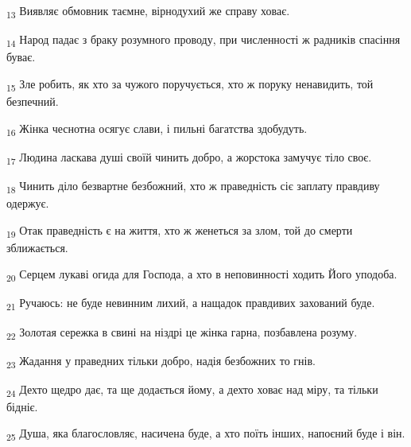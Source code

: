 \begin{tcolorbox}
\textsubscript{13} Виявляє обмовник таємне, вірнодухий же справу ховає.
\end{tcolorbox}
\begin{tcolorbox}
\textsubscript{14} Народ падає з браку розумного проводу, при численності ж радників спасіння буває.
\end{tcolorbox}
\begin{tcolorbox}
\textsubscript{15} Зле робить, як хто за чужого поручується, хто ж поруку ненавидить, той безпечний.
\end{tcolorbox}
\begin{tcolorbox}
\textsubscript{16} Жінка чеснотна осягує слави, і пильні багатства здобудуть.
\end{tcolorbox}
\begin{tcolorbox}
\textsubscript{17} Людина ласкава душі своїй чинить добро, а жорстока замучує тіло своє.
\end{tcolorbox}
\begin{tcolorbox}
\textsubscript{18} Чинить діло безвартне безбожний, хто ж праведність сіє заплату правдиву одержує.
\end{tcolorbox}
\begin{tcolorbox}
\textsubscript{19} Отак праведність є на життя, хто ж женеться за злом, той до смерти зближається.
\end{tcolorbox}
\begin{tcolorbox}
\textsubscript{20} Серцем лукаві огида для Господа, а хто в неповинності ходить Його уподоба.
\end{tcolorbox}
\begin{tcolorbox}
\textsubscript{21} Ручаюсь: не буде невинним лихий, а нащадок правдивих захований буде.
\end{tcolorbox}
\begin{tcolorbox}
\textsubscript{22} Золотая сережка в свині на ніздрі це жінка гарна, позбавлена розуму.
\end{tcolorbox}
\begin{tcolorbox}
\textsubscript{23} Жадання у праведних тільки добро, надія безбожних то гнів.
\end{tcolorbox}
\begin{tcolorbox}
\textsubscript{24} Дехто щедро дає, та ще додається йому, а дехто ховає над міру, та тільки бідніє.
\end{tcolorbox}
\begin{tcolorbox}
\textsubscript{25} Душа, яка благословляє, насичена буде, а хто поїть інших, напоєний буде і він.
\end{tcolorbox}
